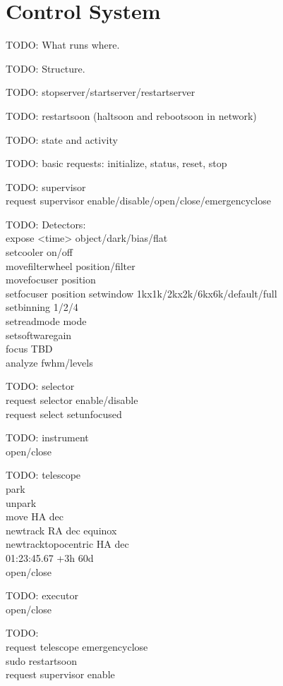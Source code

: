 \chapter{Control System}
\label{chapter:control-system}

TODO: What runs where.

TODO: Structure.

TODO: stopserver/startserver/restartserver

TODO: restartsoon (haltsoon and rebootsoon in network)

TODO: state and activity

TODO: basic requests: initialize, status, reset, stop

TODO: supervisor\\
request supervisor enable/disable/open/close/emergencyclose

TODO: Detectors:\\
expose <time> object/dark/bias/flat\\
setcooler on/off\\
movefilterwheel position/filter\\
movefocuser position \\
setfocuser position
setwindow 1kx1k/2kx2k/6kx6k/default/full\\
setbinning 1/2/4 \\
setreadmode mode \\
setsoftwaregain \\
focus TBD \\
analyze fwhm/levels

TODO: selector\\
request selector enable/disable \\
request select setunfocused

TODO: instrument\\
open/close

TODO: telescope\\
park\\
unpark\\
move HA dec \\
newtrack RA dec equinox \\
newtracktopocentric HA dec \\
01:23:45.67 +3h 60d \\
open/close

TODO: executor\\
open/close

TODO: \\
request telescope emergencyclose \\
sudo restartsoon \\
request supervisor enable